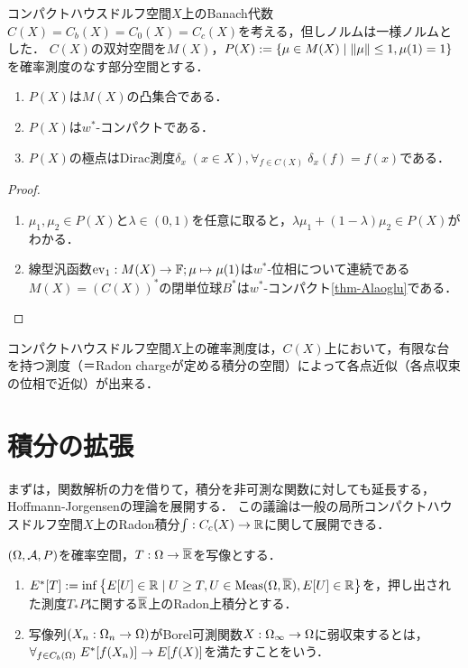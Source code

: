 \documentclass[uplatex,dvipdfmx]{jsreport}
\begin{document}
\begin{proposition}
    コンパクトハウスドルフ空間$X$上のBanach代数$C(X)=C_b(X)=C_0(X)=C_c(X)$を考える，但しノルムは一様ノルムとした．
    $C(X)$の双対空間を$M(X)$，$P(X):=\left\{\mu\in M(X)\mid\|\mu\|\le 1,\mu(1)=1\right\}$を確率測度のなす部分空間とする．
    \begin{enumerate}
        \item $P(X)$は$M(X)$の凸集合である．
        \item $P(X)$は$w^*$-コンパクトである．
        \item $P(X)$の極点はDirac測度$\delta_x\;(x\in X),\forall_{f\in C(X)}\;\delta_x(f)=f(x)$である．
    \end{enumerate}
\end{proposition}
\begin{proof}\mbox{}
    \begin{enumerate}
        \item $\mu_1,\mu_2\in P(X)$と$\lambda\in(0,1)$を任意に取ると，$\lambda\mu_1+(1-\lambda)\mu_2\in P(X)$がわかる．
        \item 線型汎函数$\mathrm{ev}_1:M(X)\to\mathbb{F};\mu\mapsto\mu(1)$は$w^*$-位相について連続である
        $M(X)=(C(X))^*$の閉単位球$B^*$は$w^*$-コンパクト\ref{thm-Alaoglu}である．
    \end{enumerate}
\end{proof}
\begin{remarks}
    コンパクトハウスドルフ空間$X$上の確率測度は，$C(X)$上において，有限な台を持つ測度（＝Radon chargeが定める積分の空間）によって各点近似（各点収束の位相で近似）が出来る．
\end{remarks}


\section{積分の拡張}

\begin{tcolorbox}[colframe=ForestGreen, colback=ForestGreen!10!white,breakable,colbacktitle=ForestGreen!40!white,coltitle=black,fonttitle=\bfseries\sffamily,
title=]
    まずは，関数解析の力を借りて，積分を非可測な関数に対しても延長する，Hoffmann-Jorgensenの理論を展開する．
    この議論は一般の局所コンパクトハウスドルフ空間$X$上のRadon積分$\int:C_c(X)\to\mathbb{R}$に関して展開できる．
\end{tcolorbox}

\begin{definition}
    $(\Omega,\mathcal{A},P)$を確率空間，$T:\Omega\to\overline{\mathbb{R}}$を写像とする．
    \begin{enumerate}
        \item $E^*[T]:=\inf\left\{E[U]\in\mathbb{R}\mid U\ge T,U\in\mathrm{Meas}(\Omega,\overline{\mathbb{R}}),E[U]\in\mathbb{R}\right\}$を，押し出された測度$T_*P$に関する$\overline{\mathbb{R}}$上のRadon上積分とする．
        \item 写像列$(X_n:\Omega_n\to\Omega)$がBorel可測関数$X:\Omega_\infty\to\Omega$に弱収束するとは，$\forall_{f\in C_b(\Omega)}\;E^*[f(X_n)]\to E[f(X)]$を満たすことをいう．
    \end{enumerate}
\end{definition}
\end{document}
